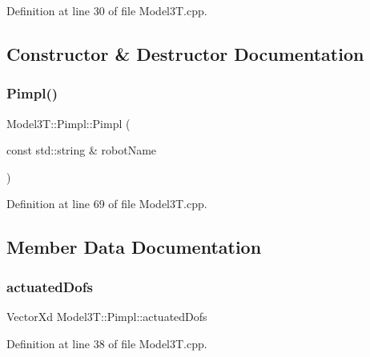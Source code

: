 Definition at line 30 of file Model3\+T.\+cpp.



\subsection{Constructor \& Destructor Documentation}
\hypertarget{structModel3T_1_1Pimpl_a087fecc74d3a9f4867e971a6f4f379ef}{}\label{structModel3T_1_1Pimpl_a087fecc74d3a9f4867e971a6f4f379ef} 
\subsubsection{\texorpdfstring{Pimpl()}{Pimpl()}}
{\footnotesize\ttfamily Model3\+T\+::\+Pimpl\+::\+Pimpl (\begin{DoxyParamCaption}\item[{const std\+::string \&}]{robot\+Name }\end{DoxyParamCaption})\hspace{0.3cm}{\ttfamily [inline]}}



Definition at line 69 of file Model3\+T.\+cpp.



\subsection{Member Data Documentation}
\hypertarget{structModel3T_1_1Pimpl_a7bf8960ca39185d73d9dcc28451ae7a3}{}\label{structModel3T_1_1Pimpl_a7bf8960ca39185d73d9dcc28451ae7a3} 
\subsubsection{\texorpdfstring{actuated\+Dofs}{actuatedDofs}}
{\footnotesize\ttfamily Vector\+Xd Model3\+T\+::\+Pimpl\+::actuated\+Dofs}



Definition at line 38 of file Model3\+T.\+cpp.

\hypertarget{structModel3T_1_1Pimpl_a79e662bd2907360085b1adda5a2217b6}{}\label{structModel3T_1_1Pimpl_a79e662bd2907360085b1adda5a2217b6} 
